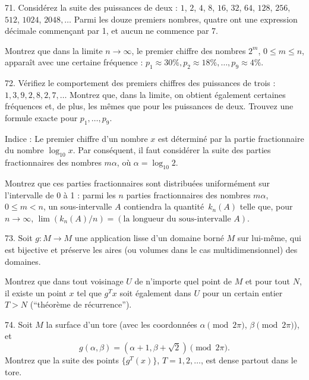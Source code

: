 \begin{problem}{71.}
    Considérez la suite des puissances de deux : $1$, $2$, $4$, $8$, $16$, $32$, $64$,
    $128$, $256$, $512$, $1024$, $2048, \dotsc$ Parmi les douze premiers nombres, quatre ont une expression décimale
    commençant par 1, et aucun ne commence par 7.

    Montrez que dans la limite $n \to \infty$, le premier chiffre des nombres $2^m$,
    $0\leqslant m \leqslant n$, apparaît avec une certaine fréquence :
    $p_1 \approx 30\%, p_2 \approx 18\%, \dotsc, p_9 \approx 4\%$.
\end{problem}

\begin{problem}{72.}
    Vérifiez le comportement des premiers chiffres des puissances de trois : $1,
    3, 9, 2, 8, 2, 7, \dotsc$ Montrez que, dans la limite, on obtient également
    certaines fréquences et, de plus, les mêmes que pour les puissances de deux.
    Trouvez une formule exacte pour $p_1, \dotsc, p_9$.

    \begin{note}{Indice :}
        Le premier chiffre d’un nombre $x$ est déterminé par la partie fractionnaire
        du nombre $\log_{10} x$. Par conséquent, il faut considérer la suite des parties fractionnaires des
        nombres $m \alpha$, où $\alpha=\log_{10} 2$.
    \end{note}
    Montrez que ces parties fractionnaires sont distribuées uniformément sur l’intervalle de 0 à 1 :
    parmi les $n$ parties fractionnaires des nombres $m \alpha$, $0 \leqslant m<n$,
    un sous-intervalle $A$ contiendra la quantité~$k_n (A)$ telle que, pour $n \to \infty$,
    $\lim (k_n (A)/n)=(\text{la longueur du sous-intervalle~$A$})$.
\end{problem}

\begin{problem}{73.}
    Soit $g\colon M \to M$ une application lisse d’un domaine borné $M$ sur lui-même, qui est
    bijective et préserve les aires (ou volumes dans le cas multidimensionnel) des domaines.

    Montrez que dans tout voisinage $U$ de n’importe quel point de $M$ et pour tout $N$, il existe un point $x$
    tel que $g^T x$ soit également dans $U$ pour un certain entier $T>N$ (\enquote{théorème de récurrence}).
\end{problem}

\begin{problem}{74.}
    Soit $M$ la surface d’un tore (avec les coordonnées $\alpha \pmod{2\pi}$, $\beta \pmod{2\pi}$),
    et
    \begin{equation*}
        g(\alpha, \beta)=(\alpha+1, \beta+ \sqrt{2}) \pmod{2\pi}.
    \end{equation*}
    Montrez que la suite des points
    $\{g^T (x)\}$, $T=1, 2, \dotsc$, est dense partout dans le tore.
\end{problem}

